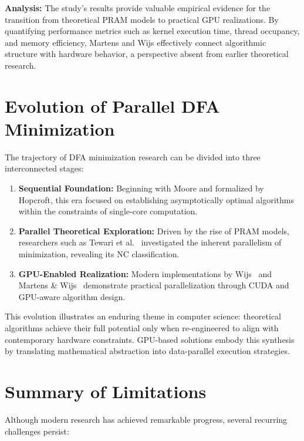 \textbf{Analysis:}
The study’s results provide valuable empirical evidence for the transition from theoretical PRAM models to practical GPU realizations. By quantifying performance metrics such as kernel execution time, thread occupancy, and memory efficiency, Martens and Wijs effectively connect algorithmic structure with hardware behavior, a perspective absent from earlier theoretical research.

\section{Evolution of Parallel DFA Minimization}

The trajectory of DFA minimization research can be divided into three interconnected stages:

\begin{enumerate}
    \item \textbf{Sequential Foundation:} Beginning with Moore and formalized by Hopcroft, this era focused on establishing asymptotically optimal algorithms within the constraints of single-core computation.
    \item \textbf{Parallel Theoretical Exploration:} Driven by the rise of PRAM models, researchers such as Tewari et al.~\cite{tewari2002} investigated the inherent parallelism of minimization, revealing its NC classification.
    \item \textbf{GPU-Enabled Realization:} Modern implementations by Wijs~\cite{wijs2015} and Martens \& Wijs~\cite{martenswijs2024} demonstrate practical parallelization through CUDA and GPU-aware algorithm design.
\end{enumerate}

This evolution illustrates an enduring theme in computer science: theoretical algorithms achieve their full potential only when re-engineered to align with contemporary hardware constraints. GPU-based solutions embody this synthesis by translating mathematical abstraction into data-parallel execution strategies.

\section{Summary of Limitations}

Although modern research has achieved remarkable progress, several recurring challenges persist:

